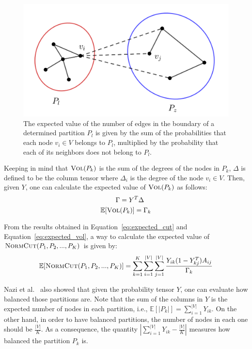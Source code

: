 \begin{figure}[h!]
    \begin{center}
        \includegraphics[scale=0.7]{expectation.png}
    \end{center}
    \caption{The expected value of the number of edges in the boundary of a determined partition $P_l$ is given by the sum of the probabilities that each node $v_i\in V$ belongs to $P_l$, multiplied by the probability that each of its neighbors does not belong to $P_l$.}
    \label{fig:expectation}
\end{figure}

Keeping in mind that $\textsc{Vol}(P_k)$ is the sum of the degrees of the nodes in $P_k$, $\Delta$ is defined to be the column tensor where $\Delta_i$ is the degree of the node $v_i\in V$. Then, given $Y$, one can calculate the expected value of $\textsc{Vol}(P_k)$ as follows:
\begin{equation}
    \label{eq:expected_vol}
    \begin{split}
        \Gamma &= Y^T\Delta \\
        \mathbb{E}[\textsc{Vol}&(P_k)] = \Gamma_k
    \end{split}
\end{equation}

From the results obtained in Equation~\ref{eq:expected_cut} and Equation~\ref{eq:expected_vol}, a way to calculate the expected value of $\textsc{NormCut}(P_1, P_2, ..., P_K)$ is given by:
\begin{equation}
    \label{eq:expected_norm_cut}
    \mathbb{E}[\textsc{NormCut}(P_1, P_2, ..., P_K)] = \sum_{k=1}^K\sum_{i=1}^{|V|}\sum_{j=1}^{|V|}\frac{Y_{ik}(1-Y_{kj}^T)A_{ij}}{\Gamma_k}
\end{equation}

Nazi et al.~\cite{gap} also showed that given the probability tensor $Y$, one can evaluate how balanced those partitions are.
Note that the sum of the columns in $Y$ is the expected number of nodes in each partition, i.e., $\mathbb{E}[|P_k|]=\sum_{i=1}^{|V|}Y_{ik}$. On the other hand, in order to have balanced partitions, the number of nodes in each one should be $\frac{|V|}{K}$. As a consequence, the quantity $\left|\sum_{i=1}^{|V|}Y_{ik} - \frac{|V|}{K}\right|$ measures how balanced the partition $P_k$ is.

